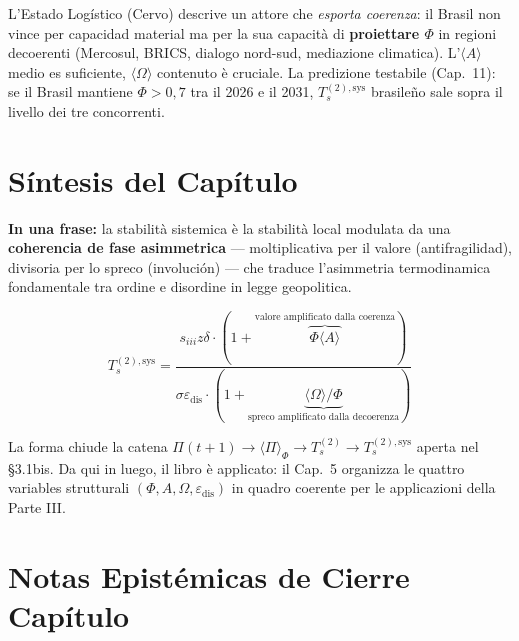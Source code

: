 L'Estado Logístico (Cervo) descrive un attore che \emph{esporta
coerenza}: il Brasil non vince per capacidad material ma per la sua
capacità di \textbf{proiettare \(\Phi\)} in regioni decoerenti
(Mercosul, BRICS, dialogo nord-sud, mediazione climatica).
L'\(\langle A\rangle\) medio es suficiente, \(\langle\Omega\rangle\)
contenuto è cruciale. La predizione testabile (Cap.~11): se il Brasil
mantiene \(\Phi > 0{,}7\) tra il 2026 e il 2031,
\(T_s^{(2),\text{sys}}\) brasileño sale sopra il livello dei tre
concorrenti.



\section{Síntesis del Capítulo}\label{sintesi-del-capítulo}

\Proved{} \textbf{In una frase:} la stabilità sistemica è la stabilità
local modulata da una \textbf{coherencia de fase asimmetrica} ---
moltiplicativa per il valore (antifragilidad), divisoria per lo spreco
(involución) --- che traduce l'asimmetria termodinamica fondamentale
tra ordine e disordine in legge geopolitica.

\[
T_s^{(2),\text{sys}} = \frac{s_{iii} z \delta \cdot (1 + \overbrace{\Phi\langle A\rangle}^{\text{valore amplificato dalla coerenza}})}{\sigma \varepsilon_{\text{dis}} \cdot (1 + \underbrace{\langle\Omega\rangle/\Phi}_{\text{spreco amplificato dalla decoerenza}})}
\]

La forma chiude la catena
\(\Pi(t+1) \to \langle\Pi\rangle_\Phi \to T_s^{(2)} \to T_s^{(2),\text{sys}}\)
aperta nel \S{}3.1bis. Da qui in luego, il libro è applicato: il Cap.~5
organizza le quattro variables strutturali
\((\Phi, A, \Omega, \varepsilon_{\text{dis}})\) in quadro coerente per
le applicazioni della Parte III.



\section{Notas Epistémicas de Cierre
Capítulo}\label{note-epistemiche-di-chiusura-capítulo}

